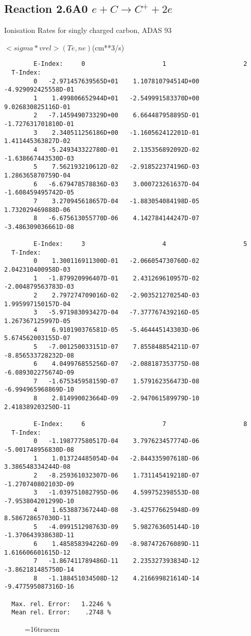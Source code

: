 \documentclass[12pt]{article}
\begin{document}
\subsection{
Reaction 2.6A0 $e + C \rightarrow C^+  + 2e $
}
  Ionisation Rates for singly charged carbon,
  ADAS 93

$ <sigma*vrel>(Te,ne) $(cm**3/s)
\begin{small}\begin{verbatim}
        E-Index:     0                     1                     2
  T-Index:
        0   -2.971457639565D+01    1.107810794514D+00   -4.929092425558D-01
        1    1.499806652944D+01   -2.549991583370D+00    9.026830825116D-01
        2   -7.145949073329D+00    6.664487958895D-01   -1.727631701810D-01
        3    2.340511256186D+00   -1.160562412201D-01    1.411445363827D-02
        4   -5.249343322780D-01    2.135356892092D-02   -1.638667443530D-03
        5    7.562193210612D-02   -2.918522374196D-03    1.286365870759D-04
        6   -6.679478578836D-03    3.000723261637D-04   -1.608459495742D-05
        7    3.270945618657D-04   -1.883054084198D-05    1.732029469888D-06
        8   -6.675613055770D-06    4.142784144247D-07   -3.486309036661D-08

        E-Index:     3                     4                     5
  T-Index:
        0    1.300116911300D-01   -2.066054730760D-02    2.042310400958D-03
        1   -1.879920996407D-01    2.431269610957D-02   -2.004879563783D-03
        2    2.797274709016D-02   -2.903521270254D-03    1.995997150157D-04
        3   -5.971983093427D-04   -7.377767439216D-05    1.267367125997D-05
        4    6.910190376581D-05   -5.464445143303D-06    5.674562003155D-07
        5   -7.001250033151D-07    7.855848854211D-07   -8.856533728232D-08
        6    4.049976855256D-07   -2.088187353775D-08   -6.089302275674D-09
        7   -1.675345958159D-07    1.579162356473D-08   -6.994965968869D-10
        8    2.814990023664D-09   -2.947061589979D-10    2.418389203250D-11

        E-Index:     6                     7                     8
  T-Index:
        0   -1.198777580517D-04    3.797623457774D-06   -5.001748956830D-08
        1    1.013724485054D-04   -2.844335907618D-06    3.386548334244D-08
        2   -8.259361032307D-06    1.731145419218D-07   -1.270740802103D-09
        3   -1.039751082795D-06    4.599752398553D-08   -7.953804201299D-10
        4    1.653887367244D-08   -3.425776625948D-09    8.586728657030D-11
        5   -4.099151298763D-09    5.982763605144D-10   -1.370643938638D-11
        6    1.485858394226D-09   -8.987472676089D-11    1.616606601615D-12
        7   -1.867411789486D-11    2.235327393834D-12   -3.862181485750D-14
        8   -1.188451034508D-12    4.216699821614D-14   -9.477595087316D-16

  Max. rel. Error:   1.2246 %
  Mean rel. Error:    .2748 %
\end{verbatim}\end{small}
\begin{figure} \label{2.6A0}
\epsfxsize=16truecm
\end{figure}
\newpage
\end{document}
